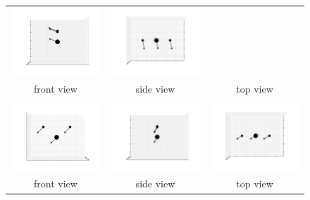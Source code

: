 \documentclass[11pt]{article}
\begin{document}
\begin{figure}[htp]
\begin{tabular}{|ccc|}
	\includegraphics[width=5.5cm,clip=true,trim=3cm 2cm 3cm 2cm]{images/0-90_1.pdf}&
	\includegraphics[width=5.5cm,clip=true,trim=3cm 2cm 3cm 2cm]{images/90-0_1.pdf}\\front view&side view&top view\\\hline&&\\
	\includegraphics[width=5.5cm,clip=true,trim=3cm 2cm 3cm 2cm]{images/0-0_2.pdf}&
	\includegraphics[width=5.5cm,clip=true,trim=3cm 2cm 3cm 2cm]{images/0-90_2.pdf}&
	\includegraphics[width=5.5cm,clip=true,trim=3cm 2cm 3cm 2cm]{images/90-0_2.pdf}\\front view&side view&top view\\\hline
	\end{tabular}
\end{figure}
\newpage
\end{document}
